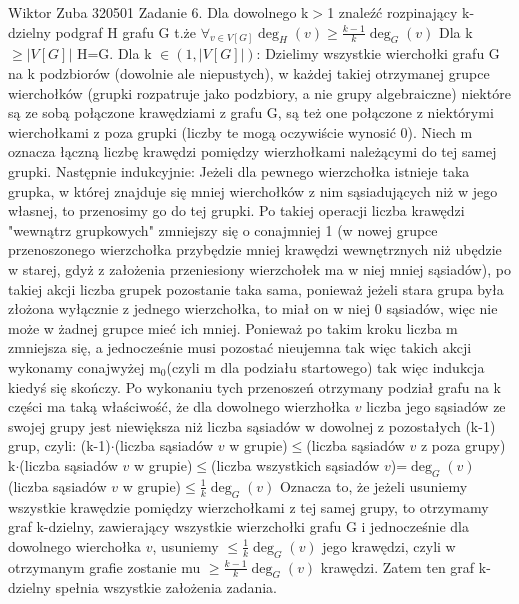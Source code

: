 \documentclass{article}
\begin{document}
Wiktor Zuba 320501
\newline
Zadanie 6.
\newline
\newline
Dla dowolnego k$>$1 znaleźć rozpinający k-dzielny podgraf H grafu G t.że $\forall_{v\in V[G]}\deg_H(v)\ge\frac{k-1}{k}\deg_G(v)$\newline\newline
Dla k $\ge|V[G]|$ H=G.\newline\newline
Dla k $\in(1,|V[G]|)$:\newline
Dzielimy wszystkie wierchołki grafu G na k podzbiorów (dowolnie ale niepustych), w każdej takiej otrzymanej grupce wierchołków
(grupki rozpatruje jako podzbiory, a nie grupy algebraiczne)
niektóre są ze sobą połączone krawędziami z grafu G, są też one połączone z niektórymi wierchołkami z poza grupki (liczby te mogą oczywiście wynosić 0).\newline
Niech m oznacza łączną liczbę krawędzi pomiędzy wierzhołkami należącymi do tej samej grupki.\newline\newline
Następnie indukcyjnie:\newline
Jeżeli dla pewnego wierzchołka istnieje taka grupka, w której znajduje się mniej wierchołków z nim sąsiadujących niż w jego własnej, to przenosimy go do tej grupki.\newline
Po takiej operacji liczba krawędzi "wewnątrz grupkowych" zmniejszy się o conajmniej 1 (w nowej grupce przenoszonego wierzchołka przybędzie mniej krawędzi wewnętrznych
niż ubędzie w starej, gdyż z założenia przeniesiony wierzchołek ma w niej mniej sąsiadów), po takiej akcji liczba grupek pozostanie taka sama,
ponieważ jeżeli stara grupa była złożona wyłącznie z jednego wierzchołka, to miał on w niej 0 sąsiadów, więc nie może w żadnej grupce mieć ich mniej.\newline
Ponieważ po takim kroku liczba m zmniejsza się, a jednocześnie musi pozostać nieujemna tak więc takich akcji wykonamy conajwyżej 
m$_0$(czyli m dla podziału startowego) tak więc indukcja kiedyś się skończy.\newline\newline
Po wykonaniu tych przenoszeń otrzymany podział grafu na k części ma taką właściwość, że dla dowolnego wierzhołka $v$ liczba jego sąsiadów ze swojej grupy
jest niewiększa niż liczba sąsiadów w dowolnej z pozostałych (k-1) grup, czyli:\newline
(k-1)$\cdot$(liczba sąsiadów $v$ w grupie)$\le$(liczba sąsiadów $v$ z poza grupy)\newline
k$\cdot$(liczba sąsiadów $v$ w grupie)$\le$(liczba wszystkich sąsiadów $v$)=$\deg_G(v)$\newline
(liczba sąsiadów $v$ w grupie)$\le\frac{1}{k}\deg_G(v)$\newline
Oznacza to, że jeżeli usuniemy wszystkie krawędzie pomiędzy wierzchołkami z tej samej grupy, to otrzymamy
graf k-dzielny, zawierający wszystkie wierzchołki grafu G i jednocześnie dla dowolnego wierchołka $v$,
usuniemy $\le\frac{1}{k}\deg_G(v)$ jego krawędzi, czyli w otrzymanym grafie zostanie mu $\ge\frac{k-1}{k}\deg_G(v)$ krawędzi.\newline
Zatem ten graf k-dzielny spełnia wszystkie założenia zadania.
\end{document}
